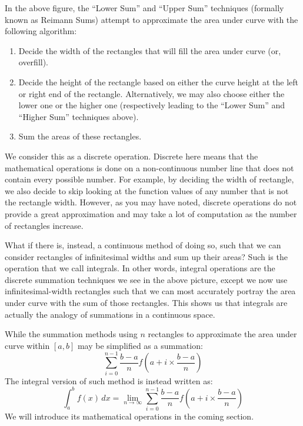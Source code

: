 In the above figure, the ``Lower Sum'' and ``Upper Sum'' techniques (formally known as Reimann Sums) attempt to approximate the area under curve with the following algorithm:
\begin{enumerate}
    \item Decide the width of the rectangles that will fill the area under curve (or, overfill).
    \item Decide the height of the rectangle based on either the curve height at the left or right end of the rectangle. Alternatively, we may also choose either the lower one or the higher one (respectively leading to the ``Lower Sum'' and ``Higher Sum'' techniques above).
    \item Sum the areas of these rectangles.
\end{enumerate}
We consider this as a discrete operation. Discrete here means that the mathematical operations is done on a non-continuous number line that does not contain every possible number. For example, by deciding the width of rectangle, we also decide to skip looking at the function values of any number that is not the rectangle width.
However, as you may have noted, discrete operations do not provide a great approximation and may take a lot of computation as the number of rectangles increase.

What if there is, instead, a continuous method of doing so, such that we can consider rectangles of infinitesimal widths and sum up their areas?
Such is the operation that we call integrals.
In other words, integral operations are the discrete summation techniques we see in the above picture, except we now use infinitesimal-width rectangles such that we can most accurately portray the area under curve with the sum of those rectangles.
This shows us that integrals are actually the analogy of summations in a continuous space.

While the summation methods using $n$ rectangles to approximate the area under curve within $[a, b]$ may be simplified as a summation:
\[
    \sum_{i=0}^{n - 1} \frac{b - a}{n} f(a + i \times \frac{b - a}{n})
\]
The integral version of such method is instead written as:
\[
    \int_a^b f(x) \,dx = \lim_{n\to\infty} \sum_{i=0}^{n - 1} \frac{b - a}{n} f(a + i \times \frac{b - a}{n})
\]
We will introduce its mathematical operations in the coming section.

